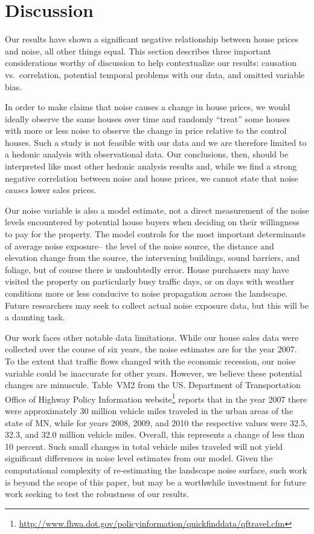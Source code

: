 \documentclass{article}\usepackage[]{graphicx}\usepackage[]{color}
\begin{document}
\section{Discussion}\label{Discussion}

Our results have shown a significant negative relationship between house prices and noise, all other things equal. This section describes three important considerations worthy of discussion to help contextualize our results: causation vs.\ correlation, potential temporal problems with our data, and omitted variable bias.

In order to make claims that noise causes a change in house prices, we would ideally observe the same houses over time and randomly ``treat'' some houses with more or less noise to observe the change in price relative to the control houses. Such a study is not feasible with our data and we are therefore limited to a hedonic analysis with observational data. Our conclusions, then, should be interpreted like most other hedonic analysis results and, while we find a strong negative correlation between noise and house prices, we cannot state that noise \emph{causes} lower sales prices. 

Our noise variable is also a model estimate, not a direct measurement of the noise levels encountered by potential house buyers when deciding on their willingness to pay for the property. The model controls for the most important determinants of average noise exposure-- the level of the noise source, the distance and elevation change from the source, the intervening buildings, sound barriers, and foliage, but of course there is undoubtedly error. House purchasers may have visited the property on particularly busy traffic days, or on days with weather conditions more or less conducive to noise propagation across the landscape. Future researchers may seek to collect actual noise exposure data, but this will be a daunting task. 

Our work faces other notable data limitations. While our house sales data were collected over the course of six years, the noise estimates are for the year 2007. To the extent that traffic flows changed with the economic recession, our noise variable could be inaccurate for other years. However, we believe these potential changes are minuscule. Table~VM2 from the US. Department of Transportation Office of Highway Policy Information website\footnote{\url{http://www.fhwa.dot.gov/policyinformation/quickfinddata/qftravel.cfm}} reports that in the year 2007 there were approximately 30 million vehicle miles traveled in the urban areas of the state of MN, while for years 2008, 2009, and 2010 the respective values were 32.5, 32.3, and 32.0 million vehicle miles. Overall, this represents a change of less than 10 percent.  Such small changes in total vehicle miles traveled will not yield significant differences in noise level estimates from our model. Given the computational complexity of re-estimating the landscape noise surface, such work is beyond the scope of this paper, but may be a worthwhile investment for future work seeking to test the robustness of our results.
\end{document}
